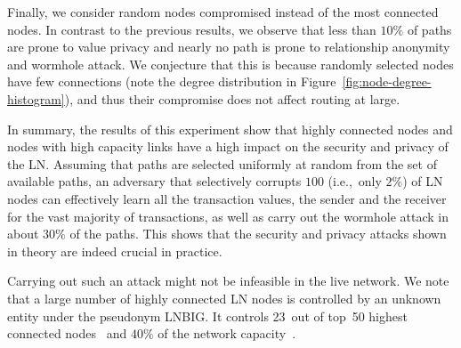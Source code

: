 Finally, we consider random nodes compromised instead of the most connected nodes.
In contrast to the previous results, we observe that less than $10\%$ of paths are prone to value privacy and nearly no path is prone 
to relationship anonymity and wormhole attack.
We conjecture that this is because randomly selected nodes have few connections (note the degree distribution in Figure~\ref{fig:node-degree-histogram}), and thus their compromise does not affect routing at large.


In summary, 
the results of this experiment show that highly connected nodes and nodes with high capacity links have a high impact on the security and privacy of the LN.
Assuming that paths are selected uniformly at random from the set of available paths, 
an adversary that selectively corrupts $100$ (i.e.,~only $2\%$) 
of LN nodes can effectively learn all the transaction values, 
the sender and the receiver for the vast majority of transactions, 
as well as carry out the wormhole attack in about $30\%$ of the paths. 
This shows that the security and privacy attacks shown in theory are indeed crucial in practice. 

Carrying out such an attack might not be infeasible in the live network. We 
note that a large number of highly connected LN nodes is controlled by an unknown entity under the pseudonym LNBIG.
It controls 23~out of top~50 highest connected nodes~\cite{1MLTopConnected} and $40\%$ of the network capacity~\cite{TheBlockLNBIG}.

